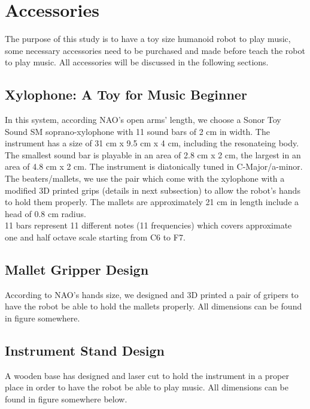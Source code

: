 \section{Accessories}
The purpose of this study is to have a toy size humanoid robot to play music,
some necessary accessories need to be purchased and made before teach the robot
to play music. All accessories will be discussed in the following sections.\\

\subsection{Xylophone: A Toy for Music Beginner}
In this system, according NAO's open arms' length, we choose a Sonor Toy Sound SM soprano-xylophone with 11 sound bars of 2 cm in width. The instrument has a size of 
31 cm x 9.5 cm x 4 cm, including the resonateing body. The smallest sound bar is 
playable in an area of 2.8 cm x 2 cm, the largest in an area of 4.8 cm x 2 cm. The 
instrument is diatonically tuned in C-Major/a-minor. The beaters/mallets, we use 
the pair which come with the xylophone with a modified 3D printed grips (details in next 
subsection) to allow the robot's hands to hold them properly. The mallets 
are approximately 21 cm in length include a head of 0.8 cm radius.\\ 
11 bars represent 11 different notes (11 frequencies) which covers 
approximate one and half octave scale starting from C6 to F7. \\

\subsection{Mallet Gripper Design}
According to NAO's hands size, we designed and 3D printed a pair of gripers to 
have the robot be able to hold the mallets properly. All dimensions can be found 
in figure somewhere.\\

\subsection{Instrument Stand Design}
A wooden base has designed and laser cut to hold the instrument in a proper place 
in order to have the robot be able to play music. All dimensions can be found in 
figure somewhere below.\\

